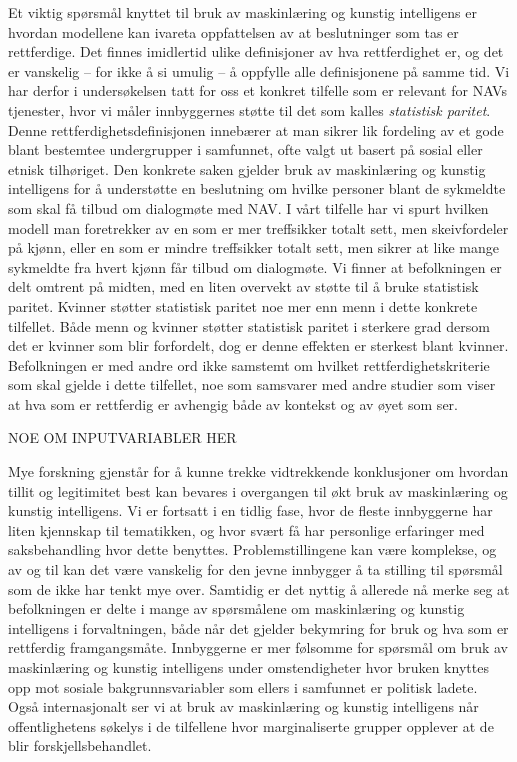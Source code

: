 \documentclass[
]{book}
\begin{document}
Et viktig spørsmål knyttet til bruk av maskinlæring og kunstig intelligens er hvordan modellene kan ivareta oppfattelsen av at beslutninger som tas er rettferdige.
Det finnes imidlertid ulike definisjoner av hva rettferdighet er, og det er vanskelig -- for ikke å si umulig -- å oppfylle alle definisjonene på samme tid.
Vi har derfor i undersøkelsen tatt for oss et konkret tilfelle som er relevant for NAVs tjenester, hvor vi måler innbyggernes støtte til det som kalles \emph{statistisk paritet}.
Denne rettferdighetsdefinisjonen innebærer at man sikrer lik fordeling av et gode blant bestemtee undergrupper i samfunnet, ofte valgt ut basert på sosial eller etnisk tilhøriget.
Den konkrete saken gjelder bruk av maskinlæring og kunstig intelligens for å understøtte en beslutning om hvilke personer blant de sykmeldte som skal få tilbud om dialogmøte med NAV.
I vårt tilfelle har vi spurt hvilken modell man foretrekker av en som er mer treffsikker totalt sett, men skeivfordeler på kjønn, eller en som er mindre treffsikker totalt sett, men sikrer at like mange sykmeldte fra hvert kjønn får tilbud om dialogmøte.
Vi finner at befolkningen er delt omtrent på midten, med en liten overvekt av støtte til å bruke statistisk paritet.
Kvinner støtter statistisk paritet noe mer enn menn i dette konkrete tilfellet.
Både menn og kvinner støtter statistisk paritet i sterkere grad dersom det er kvinner som blir forfordelt, dog er denne effekten er sterkest blant kvinner.
Befolkningen er med andre ord ikke samstemt om hvilket rettferdighetskriterie som skal gjelde i dette tilfellet, noe som samsvarer med andre studier som viser at hva som er rettferdig er avhengig både av kontekst og av øyet som ser.

NOE OM INPUTVARIABLER HER

Mye forskning gjenstår for å kunne trekke vidtrekkende konklusjoner om hvordan tillit og legitimitet best kan bevares i overgangen til økt bruk av maskinlæring og kunstig intelligens.
Vi er fortsatt i en tidlig fase, hvor de fleste innbyggerne har liten kjennskap til tematikken, og hvor svært få har personlige erfaringer med saksbehandling hvor dette benyttes.
Problemstillingene kan være komplekse, og av og til kan det være vanskelig for den jevne innbygger å ta stilling til spørsmål som de ikke har tenkt mye over.
Samtidig er det nyttig å allerede nå merke seg at befolkningen er delte i mange av spørsmålene om maskinlæring og kunstig intelligens i forvaltningen, både når det gjelder bekymring for bruk og hva som er rettferdig framgangsmåte.
Innbyggerne er mer følsomme for spørsmål om bruk av maskinlæring og kunstig intelligens under omstendigheter hvor bruken knyttes opp mot sosiale bakgrunnsvariabler som ellers i samfunnet er politisk ladete.
Også internasjonalt ser vi at bruk av maskinlæring og kunstig intelligens når offentlighetens søkelys i de tilfellene hvor marginaliserte grupper opplever at de blir forskjellsbehandlet.
\end{document}
